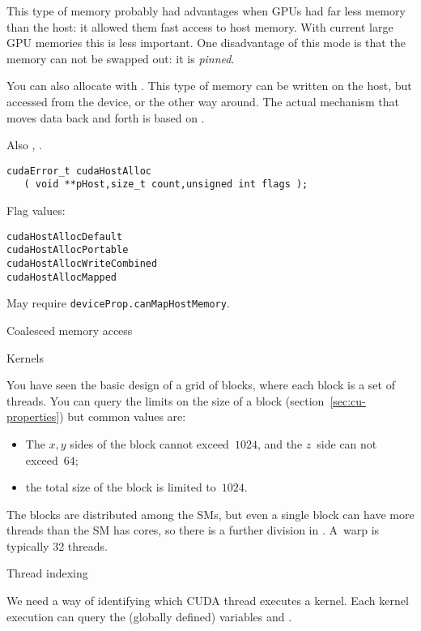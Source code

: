 This type of memory probably had advantages when \acp{GPU} had far less memory
than the host: it allowed them fast access to host memory.
With current large GPU memories this is less important.
One disadvantage of this mode is that the memory can not be swapped out:
it is \emph{pinned}.

You can also allocate  with .
This type of memory can be written on the host,
but accessed from the device, or the other way around.
The actual mechanism that moves data back and forth
is based on .

Also , .
\begin{lstlisting}
cudaError_t cudaHostAlloc
   ( void **pHost,size_t count,unsigned int flags );
\end{lstlisting}
Flag values:
\begin{lstlisting}
cudaHostAllocDefault
cudaHostAllocPortable
cudaHostAllocWriteCombined
cudaHostAllocMapped
\end{lstlisting}


May require \lstinline{deviceProp.canMapHostMemory}.

 {Coalesced memory access}

 {Kernels}

You have seen the basic design of a grid of blocks,
where each block is a set of threads.
You can query the limits on the size of a block
(section~\ref{sec:cu-properties})
but common values are:
\begin{itemize}
\item
  The $x,y$ sides of the block cannot exceed~$1024$, and the $z$~side
  can not exceed~$64$;
\item the total size of the block is limited to~$1024$.
\end{itemize}

The blocks are distributed among the \acp{SM},
but even a single block can have more threads than
the \ac{SM} has cores, so
there is a further division in .
A~warp is typically 32 threads.

 {Thread indexing}

We need a way of identifying which CUDA thread executes a kernel.
Each kernel execution can query the (globally defined) variables
 and .

